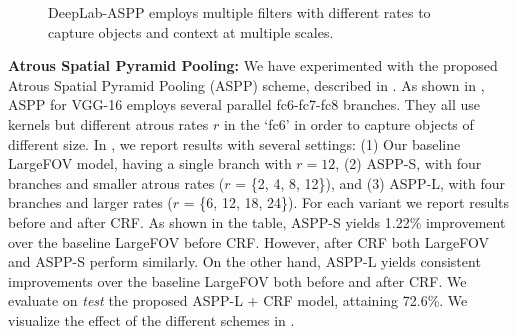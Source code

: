 \begin{figure}[!t]
  \centering
  \caption{DeepLab-ASPP employs multiple filters with different rates to capture objects and context at multiple
    scales.}
  \label{fig:diff_hole}
\end{figure}

\textbf{Atrous Spatial Pyramid Pooling:} We have experimented with the proposed
Atrous Spatial Pyramid Pooling (ASPP) scheme, described in
. As shown in , ASPP for VGG-16
employs several parallel fc6-fc7-fc8 branches. They all use  kernels
but different atrous rates $r$ in the `fc6' in order to capture objects of
different size. In , we report results with several
settings:
(1) Our baseline LargeFOV model, having a single branch with $r=12$,
(2) ASPP-S, with four branches and smaller atrous rates ($r$ = \{2, 4, 8, 12\}), and
(3) ASPP-L, with four branches and larger rates ($r$ = \{6, 12, 18, 24\}).
For each variant we report results before and after CRF.
As shown in the table, ASPP-S yields 1.22\% improvement over the baseline
LargeFOV before CRF. However, after CRF both LargeFOV and ASPP-S perform similarly.
On the other hand, ASPP-L yields consistent improvements over the baseline LargeFOV
both before and after CRF. We evaluate on \textit{test} the proposed ASPP-L + CRF
model, attaining 72.6\%. We visualize the effect of the different schemes in
.

